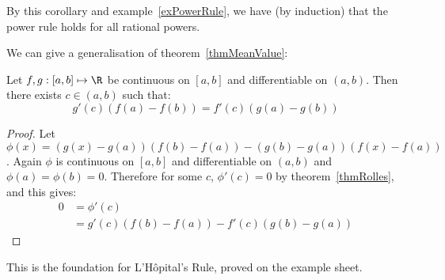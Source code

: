 \documentclass[../Main.tex]{subfiles}
\begin{document}
\begin{remark}
    By this corollary and example~\ref{exPowerRule}, we have (by induction) that the power rule holds for all rational powers.
\end{remark}
We can give a generalisation of theorem~\ref{thmMeanValue}:
\begin{theorem}
    Let $f, g : [a, b] \mapsto \R$ be continuous on $[a, b]$ and differentiable on $(a, b)$. Then there exists $c \in (a, b)$ such that:
    \begin{equation*}
        g'(c)(f(a) - f(b)) = f'(c)(g(a) - g(b))
    \end{equation*}
    \label{thmCauchyMeanValue}
\end{theorem}
\begin{proof}
    Let $\phi(x) = (g(x) - g(a))(f(b) - f(a)) - (g(b) - g(a))(f(x) - f(a))$. Again $\phi$ is continuous on $[a, b]$ and differentiable on $(a, b)$ and $\phi(a) = \phi(b) = 0$. Therefore for some $c$, $\phi'(c) = 0$ by theorem~\ref{thmRolles}, and this gives:
    \begin{align*}
        0 &= \phi'(c) \\
        &= g'(c) (f(b) - f(a)) - f'(c)(g(b) - g(a))
    \end{align*}
\end{proof}
\begin{remark}
    This is the foundation for L'H\^opital's Rule, proved on the example sheet.
\end{remark}
\end{document}
